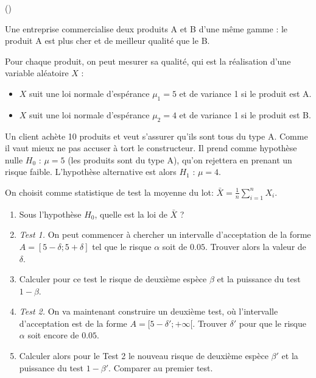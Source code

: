 \begin{exercice}\label{exoInf4} (\minsyndical)

Une entreprise commercialise deux produits A et B d'une m\^eme gamme : le produit A est plus cher et de meilleur qualit\'e que le B.

\medskip

Pour chaque produit, on peut mesurer sa qualit\'e, qui est la r\'ealisation d'une variable al\'eatoire $X$ : 

\begin{itemize}

\item $X$ suit une loi normale d'esp\'erance $\mu_1 = 5$ et de variance 1 si le produit est A.

\item $X$ suit une loi normale d'esp\'erance $\mu_2 = 4$ et de variance 1 si le produit est B.

\end{itemize}

\medskip

Un client ach\`ete 10 produits et veut s'assurer qu'ils sont tous du type A. Comme il vaut mieux ne pas accuser \`a tort le constructeur. Il prend comme hypoth\`ese nulle $H_0$ : $\mu = 5$ (les produits sont du type A), qu'on rejettera en prenant un risque faible. L'hypoth\`ese alternative est alors $H_1$ : $\mu = 4$. 

\medskip

On choisit comme statistique de test la moyenne du lot: $\bar{X} = \frac1n \sum_{i=1}^n X_i$.

\begin{enumerate}

\item Sous l'hypoth\`ese $H_0$, quelle est la loi de $\bar{X}$ ?

\item {\it Test 1.} On peut commencer \`a chercher un intervalle d'acceptation de la forme $A=[5-\delta ; 5 + \delta]$ tel que le risque $\alpha$ soit de $0.05$. Trouver alors la valeur de $\delta$.

\item Calculer pour ce test le risque de deuxi\`eme esp\`ece $\beta$ et la puissance du test $1-\beta$.

\item {\it Test 2.} On va maintenant construire un deuxi\`eme test, o\`u l'intervalle d'acceptation est de la forme $A = [5-\delta' ; +\infty [$. Trouver $\delta'$ pour que le risque $\alpha$ soit encore de $0.05$.

\item Calculer alors pour le Test 2 le nouveau risque de deuxi\`eme esp\`ece $\beta'$ et la puissance du test $1-\beta'$. Comparer au premier test.


\end{enumerate}


\end{exercice}
